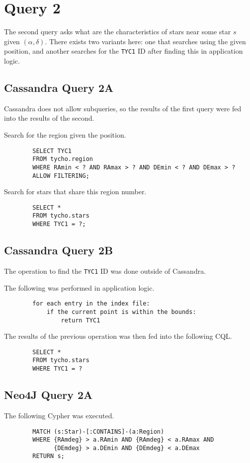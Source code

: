 \documentclass[11pt]{article}
\begin{document}
    \section{Query 2}\label{sec:query2}
    The second query asks what are the characteristics of stars near some star $s$ given $(\alpha, \delta)$.
    There exists two variants here: one that searches using the given position, and another searches for the
    \texttt{TYC1} ID after finding this in application logic.

    \subsection{Cassandra Query 2A}\label{subsec:cassandraQuery2a}
    Cassandra does not allow subqueries, so the results of the first query were fed into the results of the second.

    Search for the region given the position.
    \begin{lstlisting}
        SELECT TYC1
        FROM tycho.region
        WHERE RAmin < ? AND RAmax > ? AND DEmin < ? AND DEmax > ?
        ALLOW FILTERING;
    \end{lstlisting}

    Search for stars that share this region number.
    \begin{lstlisting}
        SELECT *
        FROM tycho.stars
        WHERE TYC1 = ?;
    \end{lstlisting}

    \subsection{Cassandra Query 2B}\label{subsec:cassandraQuery2b}
    The operation to find the \texttt{TYC1} ID was done outside of Cassandra.

    The following was performed in application logic.
    \begin{lstlisting}
        for each entry in the index file:
            if the current point is within the bounds:
                return TYC1
    \end{lstlisting}

    The results of the previous operation was then fed into the following CQL\@.
    \begin{lstlisting}
        SELECT *
        FROM tycho.stars
        WHERE TYC1 = ?
    \end{lstlisting}

    \subsection{Neo4J Query 2A}\label{subsec:neo4jQuery2a}
    The following Cypher was executed.
    \begin{lstlisting}
        MATCH (s:Star)-[:CONTAINS]-(a:Region)
        WHERE {RAmdeg} > a.RAmin AND {RAmdeg} < a.RAmax AND
              {DEmdeg} > a.DEmin AND {DEmdeg} < a.DEmax
        RETURN s;
    \end{lstlisting}
\end{document}
